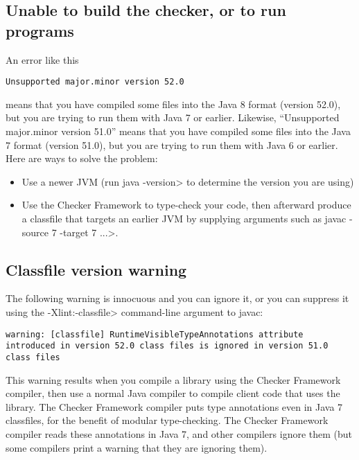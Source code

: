 \subsection{Unable to build the checker, or to run programs\label{common-problems-running-java}}

An error like this

\begin{Verbatim}
Unsupported major.minor version 52.0
\end{Verbatim}

\noindent
means that you have compiled some files into the Java 8 format (version
52.0), but you are trying to run them with Java 7 or earlier.
Likewise, ``Unsupported major.minor version 51.0''
means that you have compiled some files into the Java 7 format (version
51.0), but you are trying to run them with Java 6 or earlier.
Here are ways to solve the problem:

\begin{itemize}
\item
Use a newer JVM (run \<java -version> to
determine the version you are using)
\item
Use the Checker Framework to type-check your code, then afterward produce a
classfile that targets an earlier JVM by supplying arguments such as
\<javac -source 7 -target 7 ...>.
\end{itemize}


\subsection{Classfile version warning\label{common-problems-classfile-version}}

The following warning is innocuous and you can ignore it, or you can
suppress it using the \<-Xlint:-classfile> command-line argument to javac:

\begin{myxsmall}
\begin{Verbatim}
warning: [classfile] RuntimeVisibleTypeAnnotations attribute introduced in version 52.0 class files is ignored in version 51.0 class files
\end{Verbatim}
\end{myxsmall}

This warning results when you compile a library using the Checker Framework
compiler, then use a normal Java compiler to compile client code that uses
the library.
The Checker Framework compiler puts type annotations even in Java 7
classfiles, for the benefit of modular type-checking.  The Checker Framework
compiler reads these annotations in Java 7, and other compilers ignore them
(but some compilers print a warning that they are ignoring them).


